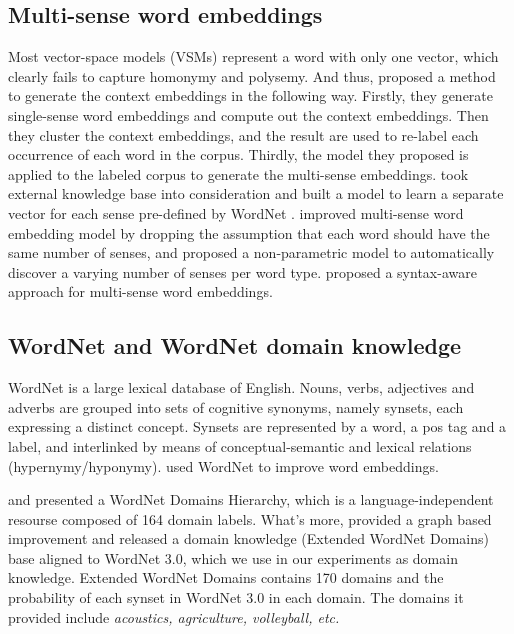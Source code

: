 \documentclass[11pt]{article}
\begin{document}
\subsection{Multi-sense word embeddings}
\par
Most vector-space models (VSMs) represent a word with only one vector, which clearly fails to capture homonymy and polysemy. And thus,  proposed a method to generate the context embeddings in the following way. Firstly, they generate single-sense word embeddings and compute out the context embeddings. Then they cluster the context embeddings, and the result are used to re-label each occurrence of each word in the corpus. Thirdly, the model they proposed is applied to the labeled corpus to generate the multi-sense embeddings.  took external knowledge base into consideration and built a model to learn a separate vector for each sense pre-defined by WordNet \cite{miller1995wordnet}.  improved multi-sense word embedding model by dropping the assumption that each word should have the same number of senses, and proposed a  non-parametric model to automatically discover a varying number of senses per word type.  proposed a syntax-aware approach for multi-sense word embeddings. 
\subsection{WordNet and WordNet domain knowledge}
\par
WordNet \cite{miller1995wordnet} is a large lexical database of English. Nouns, verbs, adjectives and adverbs are grouped into sets of cognitive synonyms, namely synsets, each expressing a distinct concept. Synsets are represented by a word, a pos tag and a label, and interlinked by means of conceptual-semantic and lexical relations (hypernymy/hyponymy).   used WordNet to improve word embeddings.
\par
{} and  presented a WordNet Domains Hierarchy, which is a language-independent resourse composed of 164 domain labels. What's more,  provided a graph based improvement and released a domain knowledge (Extended WordNet Domains) base aligned to WordNet 3.0, which we use in our experiments as domain knowledge. Extended WordNet Domains contains 170 domains and the probability of each synset in WordNet 3.0 in each domain. The domains it provided include {\sl acoustics, agriculture, volleyball, etc.}
\end{document}
